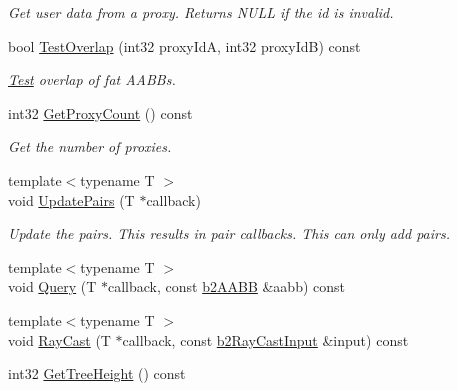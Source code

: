 \begin{DoxyCompactItemize}
\begin{DoxyCompactList}\small\item\em Get user data from a proxy. Returns N\+U\+LL if the id is invalid. \end{DoxyCompactList}\item 
bool \hyperlink{classb2_broad_phase_a1785eb29d14997d81bd537f064d22aba}{Test\+Overlap} (int32 proxy\+IdA, int32 proxy\+IdB) const \hypertarget{classb2_broad_phase_a1785eb29d14997d81bd537f064d22aba}{}\label{classb2_broad_phase_a1785eb29d14997d81bd537f064d22aba}

\begin{DoxyCompactList}\small\item\em \hyperlink{class_test}{Test} overlap of fat A\+A\+B\+Bs. \end{DoxyCompactList}\item 
int32 \hyperlink{classb2_broad_phase_a399fa4f5289a1ec46a65f726f3bac890}{Get\+Proxy\+Count} () const \hypertarget{classb2_broad_phase_a399fa4f5289a1ec46a65f726f3bac890}{}\label{classb2_broad_phase_a399fa4f5289a1ec46a65f726f3bac890}

\begin{DoxyCompactList}\small\item\em Get the number of proxies. \end{DoxyCompactList}\item 
{\footnotesize template$<$typename T $>$ }\\void \hyperlink{classb2_broad_phase_a0a1acd693466b997700242ae00784c20}{Update\+Pairs} (T $\ast$callback)\hypertarget{classb2_broad_phase_a0a1acd693466b997700242ae00784c20}{}\label{classb2_broad_phase_a0a1acd693466b997700242ae00784c20}

\begin{DoxyCompactList}\small\item\em Update the pairs. This results in pair callbacks. This can only add pairs. \end{DoxyCompactList}\item 
{\footnotesize template$<$typename T $>$ }\\void \hyperlink{classb2_broad_phase_aea5732362c8bb3959c6b24f967654d93}{Query} (T $\ast$callback, const \hyperlink{structb2_a_a_b_b}{b2\+A\+A\+BB} \&aabb) const 
\item 
{\footnotesize template$<$typename T $>$ }\\void \hyperlink{classb2_broad_phase_aebcb837120ce45bbb82b4b61db533026}{Ray\+Cast} (T $\ast$callback, const \hyperlink{structb2_ray_cast_input}{b2\+Ray\+Cast\+Input} \&input) const 
\item 
int32 \hyperlink{classb2_broad_phase_aeb9f94f44840c5bd766031d78f63ca08}{Get\+Tree\+Height} () const \hypertarget{classb2_broad_phase_aeb9f94f44840c5bd766031d78f63ca08}{}\label{classb2_broad_phase_aeb9f94f44840c5bd766031d78f63ca08}


\end{DoxyCompactItemize}
